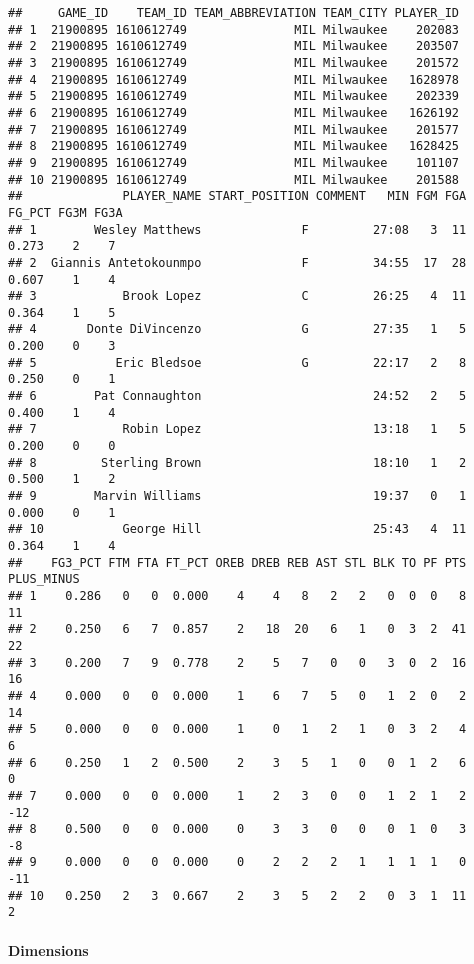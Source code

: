 \documentclass[
]{article}
\begin{document}
\begin{verbatim}
##     GAME_ID    TEAM_ID TEAM_ABBREVIATION TEAM_CITY PLAYER_ID
## 1  21900895 1610612749               MIL Milwaukee    202083
## 2  21900895 1610612749               MIL Milwaukee    203507
## 3  21900895 1610612749               MIL Milwaukee    201572
## 4  21900895 1610612749               MIL Milwaukee   1628978
## 5  21900895 1610612749               MIL Milwaukee    202339
## 6  21900895 1610612749               MIL Milwaukee   1626192
## 7  21900895 1610612749               MIL Milwaukee    201577
## 8  21900895 1610612749               MIL Milwaukee   1628425
## 9  21900895 1610612749               MIL Milwaukee    101107
## 10 21900895 1610612749               MIL Milwaukee    201588
##              PLAYER_NAME START_POSITION COMMENT   MIN FGM FGA FG_PCT FG3M FG3A
## 1        Wesley Matthews              F         27:08   3  11  0.273    2    7
## 2  Giannis Antetokounmpo              F         34:55  17  28  0.607    1    4
## 3            Brook Lopez              C         26:25   4  11  0.364    1    5
## 4       Donte DiVincenzo              G         27:35   1   5  0.200    0    3
## 5           Eric Bledsoe              G         22:17   2   8  0.250    0    1
## 6        Pat Connaughton                        24:52   2   5  0.400    1    4
## 7            Robin Lopez                        13:18   1   5  0.200    0    0
## 8         Sterling Brown                        18:10   1   2  0.500    1    2
## 9        Marvin Williams                        19:37   0   1  0.000    0    1
## 10           George Hill                        25:43   4  11  0.364    1    4
##    FG3_PCT FTM FTA FT_PCT OREB DREB REB AST STL BLK TO PF PTS PLUS_MINUS
## 1    0.286   0   0  0.000    4    4   8   2   2   0  0  0   8         11
## 2    0.250   6   7  0.857    2   18  20   6   1   0  3  2  41         22
## 3    0.200   7   9  0.778    2    5   7   0   0   3  0  2  16         16
## 4    0.000   0   0  0.000    1    6   7   5   0   1  2  0   2         14
## 5    0.000   0   0  0.000    1    0   1   2   1   0  3  2   4          6
## 6    0.250   1   2  0.500    2    3   5   1   0   0  1  2   6          0
## 7    0.000   0   0  0.000    1    2   3   0   0   1  2  1   2        -12
## 8    0.500   0   0  0.000    0    3   3   0   0   0  1  0   3         -8
## 9    0.000   0   0  0.000    0    2   2   2   1   1  1  1   0        -11
## 10   0.250   2   3  0.667    2    3   5   2   2   0  3  1  11          2
\end{verbatim}

\hypertarget{dimensions}{%
\paragraph{Dimensions}\label{dimensions}}
\end{document}
